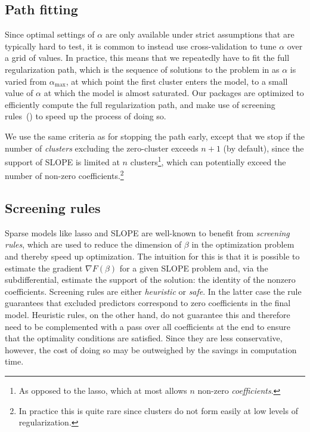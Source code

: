 \documentclass[article]{jss}
\let\Cref\crtCref
\begin{document}
\subsection{Path fitting}\label{sec:path-fitting}

Since optimal settings of \(\alpha\) are only available under strict
assumptions that are typically hard to test, it is common to instead use
cross-validation to tune \(\alpha\) over a grid of values. In practice, this
means that we repeatedly have to fit the full regularization path, which is the
sequence of solutions to the problem in \Cref{eq:slope} as \(\alpha\) is varied
from \(\alpha_\text{max}\), at which point the first cluster enters the model,
to a small value of \(\alpha\) at which the model is almost saturated. Our
packages are optimized to efficiently compute the full regularization path, and
make use of  screening rules~(\Cref{sec:screening-rules}) to speed up the
process of doing so.

We use the same criteria as \citet{friedman2010} for stopping the path early,
except that we stop if the number of \emph{clusters} excluding the zero-cluster
exceeds \(n + 1\) (by default), since the support of SLOPE is limited at \(n\)
clusters\footnote{ As opposed to the lasso, which at most allows \(n\) non-zero
  \emph{coefficients}. }, which can potentially exceed the number of non-zero
coefficients.\footnote{In practice this is quite rare since clusters do not
  form easily at low levels of regularization.}

\subsection{Screening rules}\label{sec:screening-rules}

Sparse models like lasso and SLOPE are well-known to benefit from
\emph{screening rules}, which are used to reduce the dimension of \(\beta\) in
the optimization problem and thereby speed up optimization. The intuition for
this is that it is possible to estimate the gradient \(\nabla F(\beta) \) for a
given SLOPE problem and, via the subdifferential, estimate the support of the
solution: the identity of the nonzero coefficients. Screening rules are
either \emph{heuristic} or \emph{safe}. In the latter case the rule guarantees that
excluded predictors correspond to zero coefficients in the final model. Heuristic
rules, on the other hand, do not guarantee this and therefore need to be
complemented with a pass over all coefficients at the end to ensure that the
optimality conditions are satisfied. Since they are less conservative, however,
the cost of doing so may be outweighed by the savings in computation
time.
\end{document}
